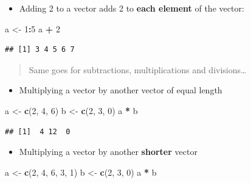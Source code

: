 \documentclass[]{book}
\newenvironment{Shaded}{\begin{snugshade}}{\end{snugshade}}
\newcommand{\DecValTok}[1]{\textcolor[rgb]{0.00,0.00,0.81}{#1}}
\newcommand{\KeywordTok}[1]{\textcolor[rgb]{0.13,0.29,0.53}{\textbf{#1}}}
\newcommand{\NormalTok}[1]{#1}
\newcommand{\OperatorTok}[1]{\textcolor[rgb]{0.81,0.36,0.00}{\textbf{#1}}}
\newcommand{\StringTok}[1]{\textcolor[rgb]{0.31,0.60,0.02}{#1}}
\providecommand{\tightlist}{%
  \setlength{\itemsep}{0pt}\setlength{\parskip}{0pt}}
\begin{document}
\begin{itemize}
\tightlist
\item
  Adding 2 to a vector adds 2 to \textbf{each element} of the vector:
\end{itemize}

\begin{Shaded}
\begin{Highlighting}[]
\NormalTok{a <-}\StringTok{ }\DecValTok{1}\OperatorTok{:}\DecValTok{5}
\NormalTok{a }\OperatorTok{+}\StringTok{ }\DecValTok{2}
\end{Highlighting}
\end{Shaded}

\begin{verbatim}
## [1] 3 4 5 6 7
\end{verbatim}

\begin{quote}
Same goes for subtractions, multiplications and divisions\ldots{}
\end{quote}

\begin{itemize}
\tightlist
\item
  Multiplying a vector by another vector of equal length
\end{itemize}

\begin{Shaded}
\begin{Highlighting}[]
\NormalTok{a <-}\StringTok{ }\KeywordTok{c}\NormalTok{(}\DecValTok{2}\NormalTok{, }\DecValTok{4}\NormalTok{, }\DecValTok{6}\NormalTok{)}
\NormalTok{b <-}\StringTok{ }\KeywordTok{c}\NormalTok{(}\DecValTok{2}\NormalTok{, }\DecValTok{3}\NormalTok{, }\DecValTok{0}\NormalTok{)}
\NormalTok{a }\OperatorTok{*}\StringTok{ }\NormalTok{b}
\end{Highlighting}
\end{Shaded}

\begin{verbatim}
## [1]  4 12  0
\end{verbatim}

\begin{itemize}
\tightlist
\item
  Multiplying a vector by another \textbf{shorter} vector
\end{itemize}

\begin{Shaded}
\begin{Highlighting}[]
\NormalTok{a <-}\StringTok{ }\KeywordTok{c}\NormalTok{(}\DecValTok{2}\NormalTok{, }\DecValTok{4}\NormalTok{, }\DecValTok{6}\NormalTok{, }\DecValTok{3}\NormalTok{, }\DecValTok{1}\NormalTok{)}
\NormalTok{b <-}\StringTok{ }\KeywordTok{c}\NormalTok{(}\DecValTok{2}\NormalTok{, }\DecValTok{3}\NormalTok{, }\DecValTok{0}\NormalTok{)}
\NormalTok{a }\OperatorTok{*}\StringTok{ }\NormalTok{b}
\end{Highlighting}
\end{Shaded}
\end{document}
